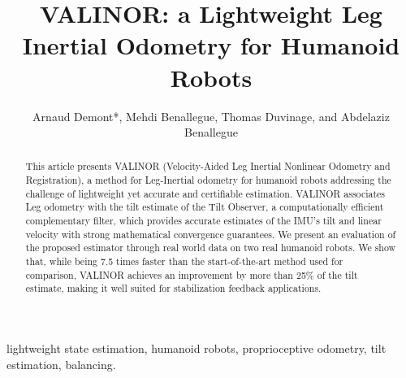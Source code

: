 \documentclass{IJCAS}
\begin{document}
\newcommand{\getErrorResult}[5]{\csname#1#2#3#4#5\endcsname}



\title{VALINOR: a Lightweight Leg Inertial Odometry for Humanoid Robots}

\author{Arnaud Demont*, Mehdi Benallegue, Thomas Duvinage, and Abdelaziz Benallegue}

\begin{abstract}
This article presents VALINOR (Velocity-Aided Leg Inertial Nonlinear Odometry and Registration), a method for Leg-Inertial odometry for humanoid robots addressing the challenge of lightweight yet accurate and certifiable estimation. VALINOR associates Leg odometry with the tilt estimate of the Tilt Observer, a computationally efficient complementary filter, which provides accurate estimates of the IMU's tilt and linear velocity with strong mathematical convergence guarantees. We present an evaluation of the proposed estimator through real world data on two real humanoid robots. We show that, while being 7.5 times faster than the start-of-the-art method used for comparison, VALINOR achieves an improvement by more than 25\% of the tilt estimate, making it well suited for stabilization feedback applications.
\end{abstract}

\begin{keywords}
  lightweight state estimation, humanoid robots, proprioceptive odometry, tilt estimation, balancing.
\end{keywords}

\maketitle

\end{document}
